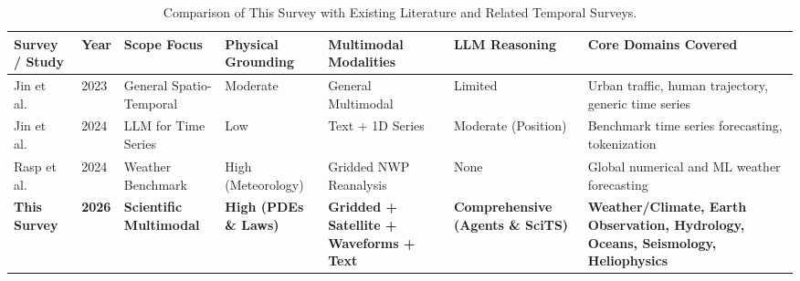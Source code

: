 \begin{table}[t]
\centering
\caption{Comparison of This Survey with Existing Literature and Related Temporal Surveys.}
\label{tab:survey_comparison}
\scriptsize
\setlength{\tabcolsep}{4pt}
\begin{tabular}{@{}lp{0.6cm}p{2.2cm}p{2.0cm}p{3.2cm}p{2.0cm}p{3.6cm}@{}}
\toprule
\textbf{Survey / Study} & \textbf{Year} & \textbf{Scope Focus} & \textbf{Physical Grounding} & \textbf{Multimodal Modalities} & \textbf{LLM Reasoning} & \textbf{Core Domains Covered} \\
\midrule
Jin et al.~\cite{jin2023largemodels} & 2023 & General Spatio-Temporal & Moderate & General Multimodal & Limited & Urban traffic, human trajectory, generic time series \\
Jin et al.~\cite{jin2024whatcan} & 2024 & LLM for Time Series & Low & Text + 1D Series & Moderate (Position) & Benchmark time series forecasting, tokenization \\
Rasp et al.~\cite{rasp2024weatherbench2} & 2024 & Weather Benchmark & High (Meteorology) & Gridded NWP Reanalysis & None & Global numerical and ML weather forecasting \\
\textbf{This Survey} & \textbf{2026} & \textbf{Scientific Multimodal} & \textbf{High (PDEs \& Laws)} & \textbf{Gridded + Satellite + Waveforms + Text} & \textbf{Comprehensive (Agents \& SciTS)} & \textbf{Weather/Climate, Earth Observation, Hydrology, Oceans, Seismology, Heliophysics} \\
\bottomrule
\end{tabular}
\end{table}

